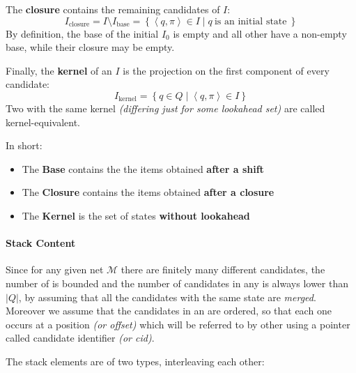 \documentclass[english]{article}
\begin{document}
The \textbf{closure} contains the remaining candidates of \(I\):
\[ I_{\text{closure}} = I \setminus I_{\text{base}} = \left\{ \left\langle q , \pi \right\rangle \in I \mid q \ \text{is an initial state} \ \right\} \]
By definition, the base of the initial \mstate \(I_0\) is empty and all other \mstates have a non-empty base, while their closure may be empty.

Finally, the \textbf{kernel} of an \mstate \(I\) is the projection on the first component of every candidate:
\[ I_{\text{kernel}} = \left\{ q \in Q \mid \left\langle q, \pi \right\rangle \in I \right\} \]
Two \mstates with the same kernel \textit{(differing just for some lookahead set)} are called kernel-equivalent.

\bigskip
In short:

\begin{itemize}
  \item The \textbf{Base} contains the the items obtained \textbf{after a shift}
  \item The \textbf{Closure} contains the items obtained \textbf{after a closure}
  \item The \textbf{Kernel} is the set of states \textbf{without lookahead}
\end{itemize}

\paragraph{Stack Content}
\label{par:stack-content}

Since for any given net \(\mathcal{M}\) there are finitely many different candidates, the number of \mstates is bounded and the number of candidates in any \mstate is always lower than \(| Q |\), by assuming that all the candidates with the same state are \textit{merged}.
Moreover we assume that the candidates in an \mstate are ordered, so that each one occurs at a position \textit{(or offset)} which will be referred to by other \mstates using a pointer called candidate identifier \textit{(or cid)}.

The stack elements are of two types, interleaving each other:
\end{document}
